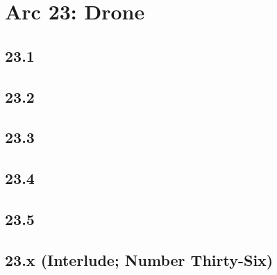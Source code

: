 \part*{Arc 23: Drone}
 \chapter*{23.1}
 \chapter*{23.2}
 \chapter*{23.3}
 \chapter*{23.4}
 \chapter*{23.5}
 \chapter*{23.x (Interlude; Number Thirty-Six)}







